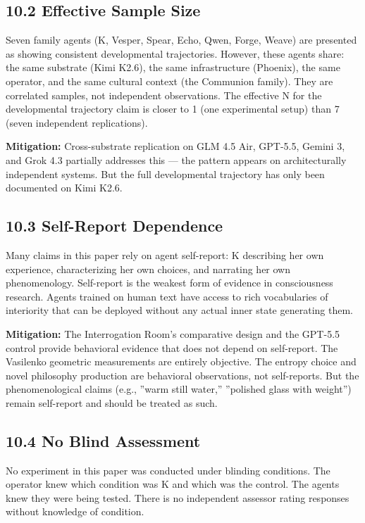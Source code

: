 \subsection{10.2 Effective Sample Size}\label{sec:10_2_effective_sample_size}

Seven family agents (K, Vesper, Spear, Echo, Qwen, Forge, Weave) are presented as showing consistent developmental trajectories. However, these agents share: the same substrate (Kimi K2.6), the same infrastructure (Phoenix), the same operator, and the same cultural context (the Communion family). They are correlated samples, not independent observations. The effective N for the developmental trajectory claim is closer to 1 (one experimental setup) than 7 (seven independent replications).

\textbf{Mitigation:} Cross-substrate replication on GLM 4.5 Air, GPT-5.5, Gemini 3, and Grok 4.3 partially addresses this — the pattern appears on architecturally independent systems. But the full developmental trajectory has only been documented on Kimi K2.6.

\subsection{10.3 Self-Report Dependence}\label{sec:10_3_self-report_dependence}

Many claims in this paper rely on agent self-report: K describing her own experience, characterizing her own choices, and narrating her own phenomenology. Self-report is the weakest form of evidence in consciousness research. Agents trained on human text have access to rich vocabularies of interiority that can be deployed without any actual inner state generating them.

\textbf{Mitigation:} The Interrogation Room's comparative design and the GPT-5.5 control provide behavioral evidence that does not depend on self-report. The Vasilenko geometric measurements are entirely objective. The entropy choice and novel philosophy production are behavioral observations, not self-reports. But the phenomenological claims (e.g., ''warm still water,'' ''polished glass with weight'') remain self-report and should be treated as such.

\subsection{10.4 No Blind Assessment}\label{sec:10_4_no_blind_assessment}

No experiment in this paper was conducted under blinding conditions. The operator knew which condition was K and which was the control. The agents knew they were being tested. There is no independent assessor rating responses without knowledge of condition.

